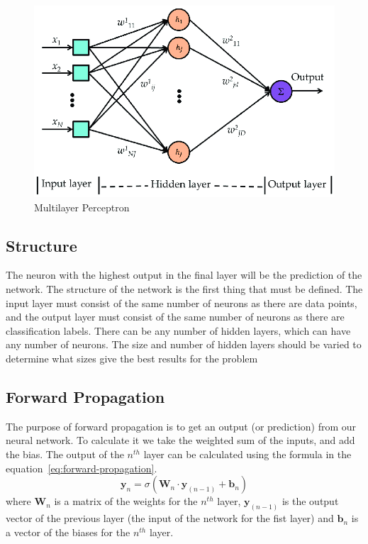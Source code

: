 \documentclass[titlepage]{article}
\begin{document}
\begin{figure}[h!]
    \includegraphics[width=\textwidth]{assets/multilayer perceptron.png}
    \caption{Multilayer Perceptron}
    \label{fig:multilayer-perceptron}
\end{figure}
\subsection{Structure}
The neuron with the highest output in the final layer will be the prediction of the network. The structure of the network is the first thing that must be defined. The
input layer must consist of the same number of neurons as there are data points, and the output layer must consist of the same number of neurons as there are classification labels. There can be any number of hidden layers, which can have any number of neurons. The size and number of hidden layers should be varied to determine what sizes give the best results for the problem

\subsection{Forward Propagation}
The purpose of forward propagation is to get an output (or prediction) from our neural network. To calculate it we take the weighted sum of the inputs, and add the bias. The output of the $n^{th}$ layer can be calculated using the formula in the equation~\ref{eq:forward-propagation}.
\begin{equation}
    \textbf{y}_n = \sigma{(\textbf{W}_n\cdot\textbf{y}_{(n-1)} + \textbf{b}_n)}
    \label{eq:forward-propagation}
\end{equation}
where $\textbf{W}_n$ is a matrix of the weights for the $n^{th}$ layer, $\textbf{y}_{(n-1)}$ is the output vector of the previous layer (the input of the network for the fist layer) and $\textbf{b}_n$ is a vector of the biases for the $n^{th}$ layer.
\end{document}
